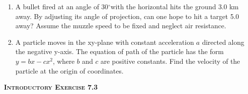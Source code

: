 \documentclass{article}
\begin{document}
\begin{enumerate}
    \item A bullet fired at an angle of 30\(^{\circ}\)with the horizontal hits the ground 3.0 km away. By adjusting its angle of projection, can one hope to hit a target 5.0 away? Assume the muzzle speed to be fixed and neglect air resistance.
    \item A particle moves in the xy-plane with constant acceleration \( a \) directed along the negative y-axis. The equation of path of the particle has the form \( y = bx - cx^2 \), where \( b \) and \( c \) are positive constants. Find the velocity of the particle at the origin of coordinates.
\end{enumerate}

\pagebreak
    \begin{center}
        \textsc{\textbf{Introductory Exercise 7.3}}
    \end{center}
\end{document}
